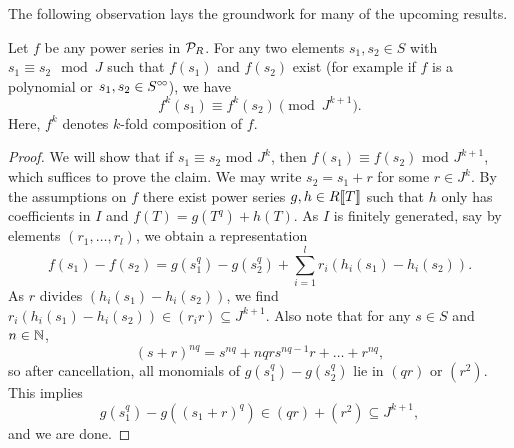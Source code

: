 \documentclass[../main.tex]{subfiles}
\begin{document}
The following observation lays the groundwork for many of the upcoming results.
\begin{lem}\label{lem:cryscalc}
  Let $f$ be any power series in $\mathcal{P}_R$. For any two elements $s_1,s_2 \in S$ 
  with $s_1 \equiv s_2 \mod J$ such that $f(s_1)$ and $f(s_2)$ exist (for
  example if $f$ is a polynomial or $s_1, s_2 \in S^{\circ \hspace{-0.5pt} \circ}$), we have 
  \begin{equation*}
    f^k(s_1) \equiv f^k(s_2) \pmod {J^{k+1}}.
  \end{equation*}
  Here, $f^k$ denotes $k$-fold composition of $f$.
\begin{proof}
  We will show that if $s_1 \equiv s_2$ mod $J^k$, then $f(s_1) \equiv f(s_2)$ mod 
  $J^{k+1}$, which suffices to prove the claim. 
  We may write $s_2 = s_1 + r$ for some $r\in J^k$. By the assumptions on $f$
  there exist power series 
  $g,h \in R\llbracket T \rrbracket$ such that $h$ only
  has coefficients in $I$ and $f(T) = g(T^q) + h(T)$. As $I$ is finitely generated,
  say by elements $(r_1, \dots, r_l)$, we obtain a representation 
  \begin{equation*}
    f(s_1) - f(s_2) = g(s_1^{q})-g(s_2^{q}) + \sum_{i=1}^l r_i \left(h_i(s_1) -
    h_i(s_2)\right).
  \end{equation*}
  As $r$ divides $\left(h_i(s_1) - h_i(s_2)\right)$, we find
  $r_i(h_i(s_1) - h_i(s_2)) \in (r_i r) \subseteq J^{k+1}$. Also note that 
  for any $s\in S$ and $n \in \mathbb{N}$, 
  $$(s+r)^{nq} = s^{nq} + nqrs^{nq-1}r + \dots + r^{nq},$$
  so after cancellation, all monomials of $g(s_1^q) - g(s_2^q)$ lie in
  $(qr)$ or $(r^2)$. This implies
  \begin{equation*}
    g(s_1^q) - g\left((s_1+r)^q\right) \in (qr) + (r^2) \subseteq J^{k+1},
  \end{equation*}
  and we are done.
\end{proof}
\end{lem}
\end{document}
